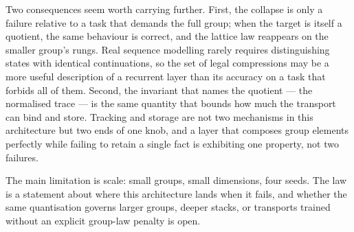 \documentclass[10pt]{article}
\begin{document}
Two consequences seem worth carrying further. First, the collapse is only a failure relative to a
task that demands the full group; when the target is itself a quotient, the same behaviour is correct,
and the lattice law reappears on the smaller group's rungs. Real sequence modelling rarely requires
distinguishing states with identical continuations, so the set of legal compressions may be a more
useful description of a recurrent layer than its accuracy on a task that forbids all of them.
Second, the invariant that names the quotient --- the normalised trace --- is the same quantity that
bounds how much the transport can bind and store. Tracking and storage are not two mechanisms in
this architecture but two ends of one knob, and a layer that composes group elements perfectly while
failing to retain a single fact is exhibiting one property, not two failures.

The main limitation is scale: small groups, small dimensions, four seeds. The law is a statement
about where this architecture lands when it fails, and whether the same quantisation governs larger
groups, deeper stacks, or transports trained without an explicit group-law penalty is open.

\small


\end{document}
